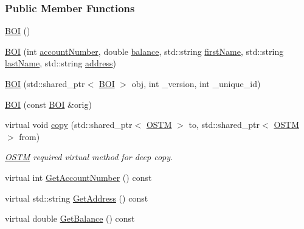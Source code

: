 \subsubsection*{Public Member Functions}
\begin{DoxyCompactItemize}
\item 
\hyperlink{class_b_o_i_a6af682a5f199a029681f0cb2b8658706_a6af682a5f199a029681f0cb2b8658706}{B\+OI} ()
\item 
\hyperlink{class_b_o_i_a1807bd07cad08109c974edbb2c32591c_a1807bd07cad08109c974edbb2c32591c}{B\+OI} (int \hyperlink{class_b_o_i_a35c9fd6e938eb44ad4e076bc6a736851_a35c9fd6e938eb44ad4e076bc6a736851}{account\+Number}, double \hyperlink{class_b_o_i_aa00a3d8baf3420647c40119b7fa4ed6f_aa00a3d8baf3420647c40119b7fa4ed6f}{balance}, std\+::string \hyperlink{class_b_o_i_a12872fd8c15dbf833f78862b00579ed1_a12872fd8c15dbf833f78862b00579ed1}{first\+Name}, std\+::string \hyperlink{class_b_o_i_ad51bfa6f28816c7f5036447ff809cecf_ad51bfa6f28816c7f5036447ff809cecf}{last\+Name}, std\+::string \hyperlink{class_b_o_i_ab9315fe76fd9f07551f5ae7899d33516_ab9315fe76fd9f07551f5ae7899d33516}{address})
\item 
\hyperlink{class_b_o_i_ae4263940f8ffdd40d5f01a714b20f791_ae4263940f8ffdd40d5f01a714b20f791}{B\+OI} (std\+::shared\+\_\+ptr$<$ \hyperlink{class_b_o_i}{B\+OI} $>$ obj, int \+\_\+version, int \+\_\+unique\+\_\+id)
\item 
\hyperlink{class_b_o_i_a7757de8d3ac656871bed4b07d77457ff_a7757de8d3ac656871bed4b07d77457ff}{B\+OI} (const \hyperlink{class_b_o_i}{B\+OI} \&orig)
\item 
virtual void \hyperlink{class_b_o_i_a9ff2d32c25c23a1bea6316f50c3bf677_a9ff2d32c25c23a1bea6316f50c3bf677}{copy} (std\+::shared\+\_\+ptr$<$ \hyperlink{class_o_s_t_m}{O\+S\+TM} $>$ to, std\+::shared\+\_\+ptr$<$ \hyperlink{class_o_s_t_m}{O\+S\+TM} $>$ from)
\begin{DoxyCompactList}\small\item\em \hyperlink{class_o_s_t_m}{O\+S\+TM} required virtual method for deep copy. \end{DoxyCompactList}\item 
virtual int \hyperlink{class_b_o_i_a5b18e1538f3d37835234946cdf9f240f_a5b18e1538f3d37835234946cdf9f240f}{Get\+Account\+Number} () const 
\item 
virtual std\+::string \hyperlink{class_b_o_i_a8920e1f47b22445ba954e86012207462_a8920e1f47b22445ba954e86012207462}{Get\+Address} () const 
\item 
virtual double \hyperlink{class_b_o_i_a25b289dece2a1685bb9d1a9332c9be0b_a25b289dece2a1685bb9d1a9332c9be0b}{Get\+Balance} () const 

\end{DoxyCompactItemize}
